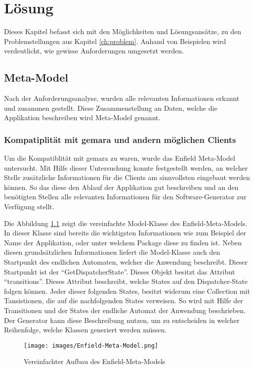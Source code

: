 \chapter{Lösung}
Dieses Kapitel befasst sich mit den Möglichkeiten und Lösungsansätze, zu den Problemstellungen aus Kapitel \ref{ch:problem}. Anhand von Beispielen wird verdeutlicht, wie gewisse Anforderungen umgesetzt werden.

\section{Meta-Model}
Nach der Anforderungsanalyse, wurden alle relevanten Informationen erkannt und zusammen gestellt. Diese Zusammenstellung an Daten, welche die Applikation beschreiben wird Meta-Model genannt.

\subsection{Kompatiplität mit \acs{gemara} und andern möglichen Clients}

Um die Kompatiblität mit \acf{gemara} zu waren, wurde das Enfield Meta-Model untersucht. Mit Hilfe dieser Untersuchung konnte festgestellt werden, an welcher Stelle zusätzliche Informationen für die Clients am sinnvollsten eingebaut werden können. So das diese den Ablauf der Applikation gut beschreiben und an den benötigten Stellen alle relevanten Informationen für den Software-Generator zur Verfügung stellt.

Die Abbildung \ref{fig:enfield-model} zeigt die vereinfachte Model-Klasse des Enfield-Meta-Models. 
In dieser Klasse sind bereits die wichtigsten Informationen wie zum Beispiel der Name der Applikation, oder unter welchem Package diese zu finden ist. Neben diesen grundsätzlichen Informationen liefert die Model-Klasse auch den Startpunkt des endlichen Automaten, welcher die Anwendung beschreibt. Dieser Startpunkt ist der \enquote{GetDispatcherState}. Dieses Objekt besitzt das Attribut \enquote{transitions}. Dieses Attribut beschreibt, welche States auf den Dispatcher-State folgen können. Jeder dieser folgenden States, besitzt widerum eine Collection mit Tansistionen, die auf die nachfolgenden States verweisen. So wird mit Hilfe der Transitionen und der States der endliche Automat der Anwendung beschrieben. Der Generator kann diese Beschreibung nutzen, um zu entscheiden in welcher Reihenfolge, welche Klassen generiert werden müssen.

\begin{figure}[H]
	\begin{center}
		\texttt{[image: images/Enfield-Meta-Model.png]}
		\caption{Vereinfachter Aufbau des Enfield-Meta-Models}
		\label{fig:enfield-model}
	\end{center}
\end{figure}

